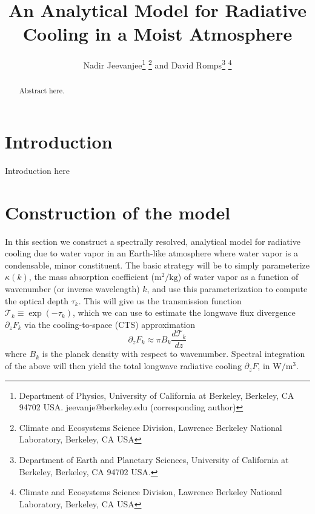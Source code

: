 \documentclass[10pt]{article}
\newcommand{\beqn}{\begin{equation}}
\newcommand{\eeqn}{\end{equation}}
\newcommand{\ppz}{\ensuremath{\partial_z}}
\newcommand{\FLW}{\ensuremath{F}}
\newcommand{\trans}{\ensuremath{\mathcal{T}}}
\begin{document}
%
%


\title{An Analytical Model for  Radiative Cooling in a Moist Atmosphere}

%
%


 \author{Nadir Jeevanjee\footnote{Department of Physics, University of California at Berkeley, Berkeley, CA 94702  USA. jeevanje@berkeley.edu (corresponding author)} \footnote{Climate and Ecosystems Science Division, Lawrence Berkeley National Laboratory, Berkeley, CA USA} and David Romps\footnote{Department of Earth and Planetary Sciences, University of California at Berkeley, Berkeley, CA 94702  USA.} \footnote{Climate and Ecosystems Science Division, Lawrence Berkeley National Laboratory, Berkeley, CA USA}
}

\maketitle

\begin{abstract}
Abstract here.

%
%
\end{abstract}


%
%


\section {Introduction}
Introduction here

\section{Construction of the model}
In this section we construct a spectrally resolved, analytical model for radiative cooling due to water vapor in an Earth-like atmosphere where water vapor is a condensable, minor constituent. The basic strategy will be to  simply parameterize $\kappa(k)$, the mass absorption coefficient ($\mathrm{m^2/kg}$) of water vapor as a function of wavenumber (or inverse wavelength) $k$, and use this parameterization to compute the optical depth $\tau_k$. This will give us the transmission function $\trans_k \equiv \exp(-\tau_k)$, which we can use to estimate the longwave flux divergence $\ppz \FLW_k$ via the cooling-to-space (CTS) approximation
	\beqn
		\ppz \FLW_k \approx \pi B_k \frac{d \trans_k}{dz} 
	\label{cts}
	\eeqn
where $B_k$ is the planck density with respect to wavenumber. Spectral integration of the above will then yield the total longwave radiative cooling $\ppz \FLW$, in $\mathrm{W/m^3}$.
\end{document}
